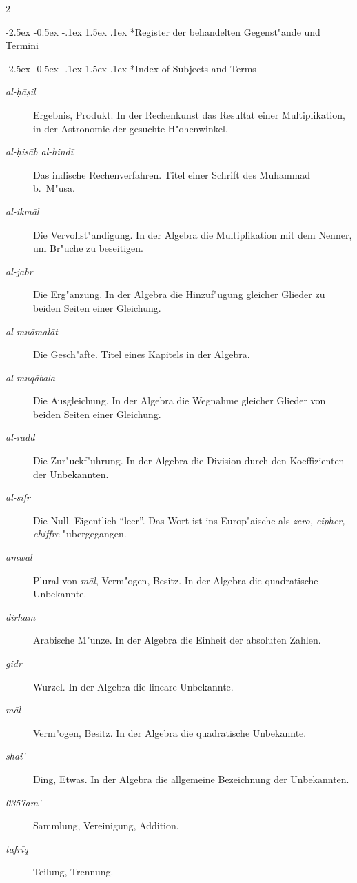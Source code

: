 \documentclass[10pt,a4paper]{article}
\makeatletter
\newcommand{\enquote}[1]{``#1''}
\renewcommand{\section}{\@startsection{section}{1}{\z@}%
  {-2.5ex \@plus -0.5ex \@minus -.1ex}%
  {1.5ex \@plus .1ex}%
  {\normalfont\large\bfseries\color{sectioncolor}}}
\makeatother
\begin{document}
\clearpage

\begin{paracol}{2}

\section*{Register der behandelten Gegenst"ande und Termini}

\switchcolumn

\section*{Index of Subjects and Terms}

\switchcolumn*

\begin{description}
\item[\textit{al-\d{h}\=a\d{s}il}] Ergebnis, Produkt. In der Rechenkunst das Resultat einer Multiplikation, in der Astronomie der gesuchte H"ohenwinkel.
\item[\textit{al-\d{h}is\=ab al-hind\=i}] Das indische Rechenverfahren. Titel einer Schrift des Muhammad b.\ M"us\=a.
\item[\textit{al-ikm\=al}] Die Vervollst"andigung. In der Algebra die Multiplikation mit dem Nenner, um Br"uche zu beseitigen.
\item[\textit{al-jabr}] Die Erg"anzung. In der Algebra die Hinzuf"ugung gleicher Glieder zu beiden Seiten einer Gleichung.
\item[\textit{al-mu\=amal\=at}] Die Gesch"afte. Titel eines Kapitels in der Algebra.
\item[\textit{al-muq\=abala}] Die Ausgleichung. In der Algebra die Wegnahme gleicher Glieder von beiden Seiten einer Gleichung.
\item[\textit{al-radd}] Die Zur"uckf"uhrung. In der Algebra die Division durch den Koeffizienten der Unbekannten.
\item[\textit{al-sifr}] Die Null. Eigentlich \enquote{leer}. Das Wort ist ins Europ"aische als \textit{zero, cipher, chiffre} "ubergegangen.
\item[\textit{amw\=al}] Plural von \textit{m\=al}, Verm"ogen, Besitz. In der Algebra die quadratische Unbekannte.
\item[\textit{dirham}] Arabische M"unze. In der Algebra die Einheit der absoluten Zahlen.
\item[\textit{gidr}] Wurzel. In der Algebra die lineare Unbekannte.
\item[\textit{m\=al}] Verm"ogen, Besitz. In der Algebra die quadratische Unbekannte.
\item[\textit{shai'}] Ding, Etwas. In der Algebra die allgemeine Bezeichnung der Unbekannten.
\item[\textit{\u0357{}am'}] Sammlung, Vereinigung, Addition.
\item[\textit{tafr\={i}q}] Teilung, Trennung.
\end{description}


\end{paracol}
\end{document}
